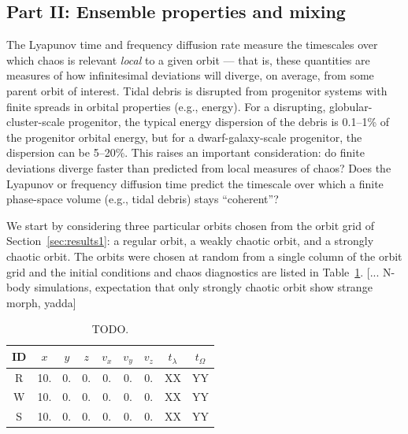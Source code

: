 \documentclass[letterpaper,12pt,preprint]{aastex}
\begin{document}
\subsection{Part II: Ensemble properties and mixing} \label{sec:results2}


The Lyapunov time and frequency diffusion rate measure the timescales over which chaos is relevant \emph{local} to a given orbit --- that is, these quantities are measures of how infinitesimal deviations will diverge, on average, from some parent orbit of interest. Tidal debris is disrupted from progenitor systems with finite spreads in orbital properties (e.g., energy). For a disrupting, globular-cluster-scale progenitor, the typical energy dispersion of the debris is 0.1--1\% of the progenitor orbital energy, but for a dwarf-galaxy-scale progenitor, the dispersion can be 5--20\%. This raises an important consideration: do finite deviations diverge faster than predicted from local measures of chaos? Does the Lyapunov or frequency diffusion time predict the timescale over which a finite phase-space volume (e.g., tidal debris) stays ``coherent''?

We start by considering three particular orbits chosen from the orbit grid of Section~\ref{sec:results1}: a regular orbit, a weakly chaotic orbit, and a strongly chaotic orbit. The orbits were chosen at random from a single column of the orbit grid and the initial conditions and chaos diagnostics are listed in Table~\ref{tbl:three-orbits}. [... N-body simulations, expectation that only strongly chaotic orbit show strange morph, yadda]

\begin{table}[ht]
\begin{center}
	\begin{tabular}{c | c c c c c c c c }
		ID & $x$ & $y$ & $z$ & $v_x$ & $v_y$ & $v_z$ & $t_\lambda$ & $t_\Omega$ \\\toprule
		R & 10. & 0. & 0. & 0. & 0. & 0. & XX & YY\\
		\midrule
		W & 10. & 0. & 0. & 0. & 0. & 0. & XX & YY\\
		\midrule
		S & 10. & 0. & 0. & 0. & 0. & 0. & XX & YY\\
		\bottomrule
		\end{tabular}
	\caption{TODO. \label{tbl:three-orbits}}
\end{center}
\end{table}
\end{document}
